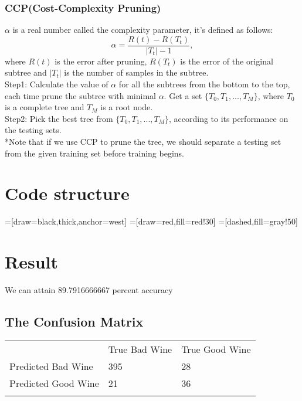 \documentclass[50pt]{article}
\begin{document}
\subsubsection{CCP(Cost-Complexity Pruning)}
$\alpha$ is a real number called the complexity parameter, it's defined as follows: 
$$\alpha = \frac{R(t)- R(T_{t})}{|T_{t}|-1},$$ where $R(t)$ is the error after pruning, $R(T_{t})$ is the error of the original subtree and $|T_{t}|$ is the number of samples in the subtree.\\
Step1: Calculate the value of $\alpha$ for all the subtrees from the bottom to the top, each time prune the subtree with minimal $\alpha$. Get a set $\{T_{0}, T_{1},..., T_{M}\}$, where $T_{0}$ is a complete tree and $T_{M}$ is a root node.\\
Step2: Pick the best tree from $\{T_{0}, T_{1},..., T_{M}\}$, according to its performance on the testing sets.\\
*Note that if we use CCP to prune the tree, we should separate a testing set from the given training set before training begins.
\section{Code structure}
=[draw=black,thick,anchor=west]
	=[draw=red,fill=red!30]
	=[dashed,fill=gray!50]
\section{Result}
We can attain 89.7916666667 percent accuracy
\makeatletter
\setlength{@fptop}{5pt}
\subsection{The Confusion Matrix}

\begin{table}[]
    \begin{tabular}{lll}
     & True Bad Wine & True Good Wine \\
     Predicted Bad Wine & 395 & 28 \\
     Predicted Good Wine & 21 & 36 \\
     &  & 
    \end{tabular}
\end{table}
\end{document}
